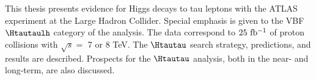 

This thesis presents evidence for Higgs decays to tau leptons with the ATLAS experiment at the Large Hadron Collider. Special emphasis is given to the VBF $\Htautaulh$ category of the analysis. The data correspond to $25\ \ifb$ of proton collisions with $\sqrt{s} = $ 7 or 8 TeV. The $\Htautau$ search strategy, predictions, and results are described. Prospects for the $\Htautau$ analysis, both in the near- and long-term, are also discussed.


